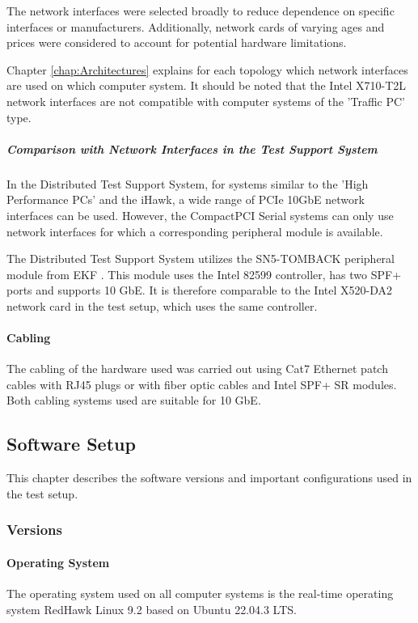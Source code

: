The network interfaces were selected broadly to reduce dependence on specific interfaces or manufacturers. Additionally, network cards of varying ages and prices were considered to account for potential hardware limitations.

Chapter \ref{chap:Architectures} explains for each topology which network interfaces are used on which computer system. It should be noted that the Intel X710-T2L network interfaces are not compatible with computer systems of the 'Traffic PC' type.


\subparagraph{Comparison with Network Interfaces in the Test Support System}

In the Distributed Test Support System, for systems similar to the 'High Performance PCs' and the iHawk, a wide range of PCIe 10GbE network interfaces can be used. However, the CompactPCI Serial systems can only use network interfaces for which a corresponding peripheral module is available.

The Distributed Test Support System utilizes the SN5-TOMBACK peripheral module from EKF \cite{setupnw05}. This module uses the Intel 82599 controller, has two SPF+ ports and supports 10 GbE. It is therefore comparable to the Intel X520-DA2 network card in the test setup, which uses the same controller.

\paragraph{Cabling}
The cabling of the hardware used was carried out using Cat7 Ethernet patch cables with RJ45 plugs or with fiber optic cables and Intel SPF+ SR modules. Both cabling systems used are suitable for 10 GbE.

\subsection{Software Setup}
This chapter describes the software versions and important configurations used in the test setup.

\subsubsection{Versions}
\paragraph{Operating System}
The operating system used on all computer systems is the real-time operating system RedHawk Linux 9.2 based on Ubuntu 22.04.3 LTS.

